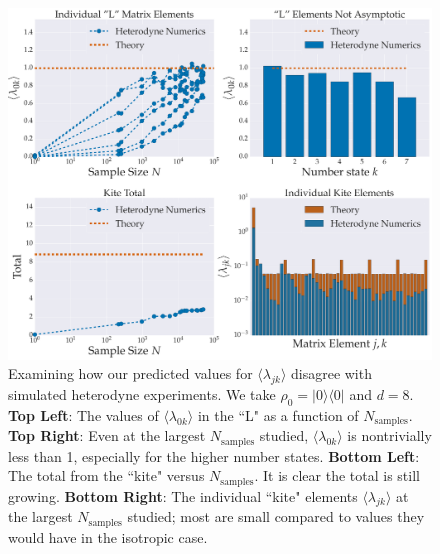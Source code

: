 \documentclass[aps,pra, twocolumn]{revtex4-1}
\begin{document}
\begin{figure}[h]
  \includegraphics[width=\columnwidth]{Images/Figure_11.pdf}
 \caption{Examining how our predicted values for $\langle \lambda_{jk} \rangle$ disagree with simulated heterodyne experiments. We take $\rho_{0} = |0\rangle\langle 0|$ and $d=8$. \textbf{Top Left}: The values of  $\langle \lambda_{0k}\rangle$ in the ``L" as a function of $N_{\mathrm{samples}}$.  \textbf{Top Right}:  Even at the largest $N_{\mathrm{samples}}$ studied, $\langle \lambda_{0k}\rangle$ is nontrivially less than 1, especially for the higher number states. \textbf{Bottom Left}: The total from the ``kite" versus $N_{\mathrm{samples}}$. It is clear the total is still growing. \textbf{Bottom Right}: The individual ``kite" elements $\langle \lambda_{jk}\rangle$ at the largest $N_{\mathrm{samples}}$ studied;  most are small compared to values they would have in the isotropic case.}
\label{fig:individcontrib}
\end{figure}
\end{document}
